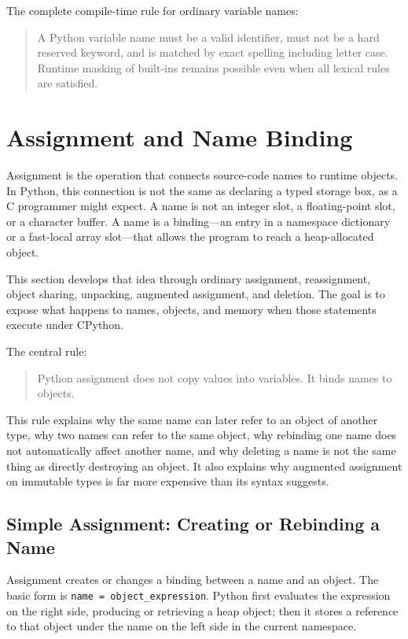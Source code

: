 \documentclass[a4paper,twoside]{report}
\begin{document}
The complete compile-time rule for ordinary variable names:

\begin{quote}
A Python variable name must be a valid identifier, must not be a hard reserved keyword, and is matched by exact spelling including letter case. Runtime masking of built-ins remains possible even when all lexical rules are satisfied.
\end{quote}


\section{Assignment and Name Binding}

Assignment is the operation that connects source-code names to runtime objects. In Python, this connection is not the same as declaring a typed storage box, as a C programmer might expect. A name is not an integer slot, a floating-point slot, or a character buffer. A name is a binding---an entry in a namespace dictionary or a fast-local array slot---that allows the program to reach a heap-allocated object.

This section develops that idea through ordinary assignment, reassignment, object sharing, unpacking, augmented assignment, and deletion. The goal is to expose what happens to names, objects, and memory when those statements execute under CPython.

The central rule:

\begin{quote}
Python assignment does not copy values into variables. It binds names to objects.
\end{quote}

This rule explains why the same name can later refer to an object of another type, why two names can refer to the same object, why rebinding one name does not automatically affect another name, and why deleting a name is not the same thing as directly destroying an object. It also explains why augmented assignment on immutable types is far more expensive than its syntax suggests.


\subsection{Simple Assignment: Creating or Rebinding a Name}

Assignment creates or changes a binding between a name and an object. The basic form is \texttt{name = object\_expression}. Python first evaluates the expression on the right side, producing or retrieving a heap object; then it stores a reference to that object under the name on the left side in the current namespace.
\end{document}
